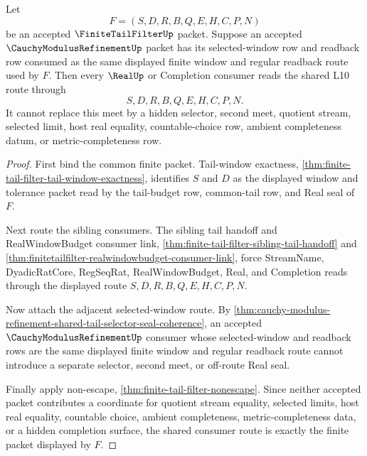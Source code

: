 \begin{theorem}
\label{thm:finite-tail-filter-shared-window-meet}
Let
$$
F=(S,D,R,B,Q,E,H,C,P,N)
$$
be an accepted $\FiniteTailFilterUp$ packet. Suppose an accepted $\CauchyModulusRefinementUp$ packet has its selected-window row and readback row consumed as the same displayed finite window and regular readback route used by $F$. Then every $\RealUp$ or Completion consumer reads the shared L10 route through
$$
S,D,R,B,Q,E,H,C,P,N.
$$
It cannot replace this meet by a hidden selector, second meet, quotient stream, selected limit, host real equality, countable-choice row, ambient completeness datum, or metric-completeness row.
\end{theorem}
\begin{proof}
First bind the common finite packet. Tail-window exactness, \autoref{thm:finite-tail-filter-tail-window-exactness}, identifies $S$ and $D$ as the displayed window and tolerance packet read by the tail-budget row, common-tail row, and Real seal of $F$.

Next route the sibling consumers. The sibling tail handoff and RealWindowBudget consumer link, \autoref{thm:finite-tail-filter-sibling-tail-handoff} and \autoref{thm:finitetailfilter-realwindowbudget-consumer-link}, force StreamName, DyadicRatCore, RegSeqRat, RealWindowBudget, Real, and Completion reads through the displayed route $S,D,R,B,Q,E,H,C,P,N$.

Now attach the adjacent selected-window route. By \autoref{thm:cauchy-modulus-refinement-shared-tail-selector-seal-coherence}, an accepted $\CauchyModulusRefinementUp$ consumer whose selected-window and readback rows are the same displayed finite window and regular readback route cannot introduce a separate selector, second meet, or off-route Real seal.

Finally apply non-escape, \autoref{thm:finite-tail-filter-nonescape}. Since neither accepted packet contributes a coordinate for quotient stream equality, selected limits, host real equality, countable choice, ambient completeness, metric-completeness data, or a hidden completion surface, the shared consumer route is exactly the finite packet displayed by $F$.
\end{proof}

